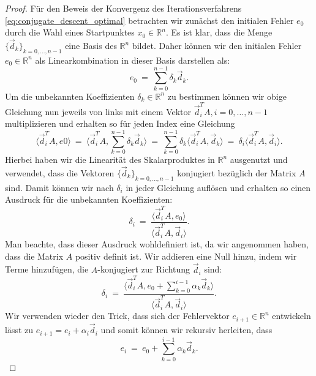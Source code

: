 \begin{proof}
Für den Beweis der Konvergenz des Iterationsverfahrens \eqref{eq:conjugate_descent_optimal} betrachten wir zunächst den initialen Fehler $e_0$ durch die Wahl eines Startpunktes $x_0 \in \mathbb{R}^n$.
Es ist klar, dass die Menge $\lbrace \vec{d}_k \rbrace_{k=0,\ldots,n-1}$ eine Basis des $\mathbb{R}^n$ bildet.
Daher können wir den initialen Fehler $e_0 \in \mathbb{R}^n$ als Linearkombination in dieser Basis darstellen als:
\begin{equation}
\label{eq:error_basis}
e_0 \ = \ \sum_{k=0}^{n-1} \delta_k \vec{d}_k.
\end{equation}
Um die unbekannten Koeffizienten $\delta_k \in \mathbb{R}^n$ zu bestimmen können wir obige Gleichung nun jeweils von links mit einem Vektor $\vec{d}_i^T A, i=0,\ldots,n-1$ multiplizieren und erhalten so für jeden Index eine Gleichung
\begin{equation*}
\langle \vec{d}_i^T A, e0 \rangle \ = \ \langle \vec{d}_i^T A, \sum_{k=0}^{n-1} \delta_k \vec{d}_k \rangle \ = \ \sum_{k=0}^{n-1} \delta_k \langle \vec{d}_i^T A, \vec{d}_k \rangle \ = \ \delta_i \langle \vec{d}_i^T A, \vec{d}_i \rangle.
\end{equation*}
Hierbei haben wir die Linearität des Skalarproduktes in $\mathbb{R}^n$ ausgenutzt und verwendet, dass die Vektoren $\lbrace \vec{d}_k \rbrace_{k=0,\ldots,n-1}$ konjugiert bezüglich der Matrix $A$ sind.
Damit können wir nach $\delta_i$ in jeder Gleichung auflösen und erhalten so einen Ausdruck für die unbekannten Koeffizienten:
\begin{equation*}
\delta_i \ = \ \frac{\langle \vec{d}_i^T A, e_0 \rangle}{\langle \vec{d}_i^T A, \vec{d}_i \rangle}.
\end{equation*}
Man beachte, dass dieser Ausdruck wohldefiniert ist, da wir angenommen haben, dass die Matrix $A$ positiv definit ist.
Wir addieren eine Null hinzu, indem wir Terme hinzufügen, die $A$-konjugiert zur Richtung $\vec{d}_i$ sind:
\begin{equation}
\label{eq:delta_coefficients}
\delta_i \ = \ \frac{\langle \vec{d}_i^T A, e_0 +\sum_{k=0}^{i-1} \alpha_k \vec{d}_k \rangle}{\langle \vec{d}_i^T A, \vec{d}_i \rangle}.
\end{equation}
Wir verwenden wieder den Trick, dass sich der Fehlervektor $e_{i+1} \in \mathbb{R}^n$ entwickeln lässt zu $e_{i+1} = e_i + \alpha_i \vec{d}_i$ und somit können wir rekursiv herleiten, dass
\begin{equation}
\label{eq:error_recursive}
e_i \ = \ e_0 + \sum_{k=0}^{i-1} \alpha_k \vec{d}_k.

\end{equation}
\end{proof}

